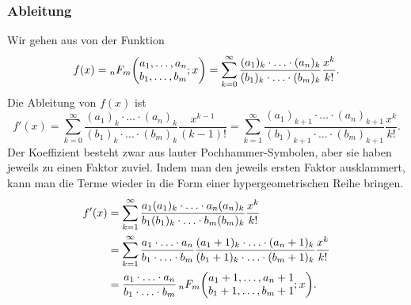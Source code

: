 \subsubsection{Ableitung}
Wir gehen aus von der Funktion
\begin{equation}
f(x)
=
\mathstrut_nF_m\biggl(
\begin{matrix}a_1,\dots,a_n\\b_1,\dots,b_m\end{matrix};
x\biggr)
=
\sum_{k=0}^\infty
\frac{
(a_1)_k\cdot\ldots\cdot(a_n)_k
}{
(b_1)_k\cdot\ldots\cdot(b_m)_k
}
\frac{x^k}{k!}.
\label{buch:rekursion:hypergeometrisch:eqn:f}
\end{equation}
Die Ableitung von $f(x)$ ist
\[
f'(x)
=
\sum_{k=0}^\infty
\frac{
(a_1)_k\cdot\ldots\cdot(a_n)_k
}{
(b_1)_k\cdot\ldots\cdot(b_m)_k
}
\frac{x^{k-1}}{(k-1)!}
=
\sum_{k=1}^\infty
\frac{
(a_1)_{k+1}\cdot\ldots\cdot(a_n)_{k+1}
}{
(b_1)_{k+1}\cdot\ldots\cdot(b_m)_{k+1}
}
\frac{x^k}{k!}.
\]
Der Koeffizient besteht zwar aus lauter Pochhammer-Symbolen, aber sie
haben jeweils zu einen Faktor zuviel.
Indem man den jeweils ersten Faktor ausklammert, kann man die
Terme wieder in die Form einer hypergeometrischen Reihe bringen.
\begin{align*}
f'(x)
&=
\sum_{k=1}^\infty
\frac{
a_1(a_1)_{k}\cdot\ldots\cdot a_n(a_n)_{k}
}{
b_1(b_1)_{k}\cdot\ldots\cdot b_m(b_m)_{k}
}
\frac{x^k}{k!}
\\
&=
\sum_{k=1}^\infty
\frac{
a_1\cdot\ldots\cdot a_n
}{
b_1\cdot\ldots\cdot b_m
}
\frac{
(a_1+1)_{k}\cdot\ldots\cdot(a_n+1)_{k}
}{
(b_1+1)_{k}\cdot\ldots\cdot(b_m+1)_{k}
}
\frac{x^k}{k!}
\\
&=
\frac{
a_1\cdot\ldots\cdot a_n
}{
b_1\cdot\ldots\cdot b_m
}
\,
\mathstrut_nF_m\biggl(
\begin{matrix}a_1+1,\dots,a_n+1\\b_1+1,\dots,b_m+1\end{matrix};
x\biggr).
\end{align*}

